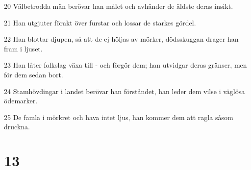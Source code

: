 \par 20 Välbetrodda män berövar han målet och avhänder de äldste deras insikt.
\par 21 Han utgjuter förakt över furstar och lossar de starkes gördel.
\par 22 Han blottar djupen, så att de ej höljas av mörker, dödsskuggan drager han fram i ljuset.
\par 23 Han låter folkslag växa till - och förgör dem; han utvidgar deras gränser, men för dem sedan bort.
\par 24 Stamhövdingar i landet berövar han förståndet, han leder dem vilse i väglösa ödemarker.
\par 25 De famla i mörkret och hava intet ljus, han kommer dem att ragla såsom druckna.

\chapter{13}

